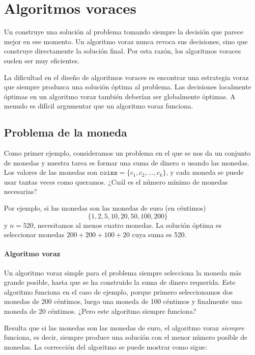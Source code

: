 \chapter{Algoritmos voraces}


Un 
construye una solución al problema
tomando siempre la decisión que parece
mejor en ese momento.
Un algoritmo voraz nunca revoca
sus decisiones, sino que construye directamente
la solución final.
Por esta razón, los algoritmos voraces
suelen ser muy eficientes.

La dificultad en el diseño de algoritmos voraces
es encontrar una estrategia voraz
que siempre produzca una solución óptima
al problema.
Las decisiones localmente óptimas en un algoritmo voraz
también deberían ser globalmente óptimas.
A menudo es difícil argumentar que
un algoritmo voraz funciona.

\section{Problema de la moneda}

Como primer ejemplo, consideramos un problema
en el que se nos da un conjunto de monedas
y nuestra tarea es formar una suma de dinero $n$
usando las monedas.
Los valores de las monedas son
$\texttt{coins}=\{c_1,c_2,\ldots,c_k\}$,
y cada moneda se puede usar tantas veces como queramos.
¿Cuál es el número mínimo de monedas necesarias?

Por ejemplo, si las monedas son las monedas de euro (en céntimos)
\[\{1,2,5,10,20,50,100,200\}\]
y $n=520$,
necesitamos al menos cuatro monedas.
La solución óptima es seleccionar monedas
$200+200+100+20$ cuya suma es 520.

\subsubsection{Algoritmo voraz}

Un algoritmo voraz simple para el problema
siempre selecciona la moneda más grande posible,
hasta que se ha construido la suma de dinero requerida.
Este algoritmo funciona en el caso de ejemplo,
porque primero seleccionamos dos monedas de 200 céntimos,
luego una moneda de 100 céntimos y finalmente una moneda de 20 céntimos.
¿Pero este algoritmo siempre funciona?

Resulta que si las monedas son las monedas de euro,
el algoritmo voraz \emph{siempre} funciona, es decir,
siempre produce una solución con el menor
número posible de monedas.
La corrección del algoritmo se puede
mostrar como sigue:

